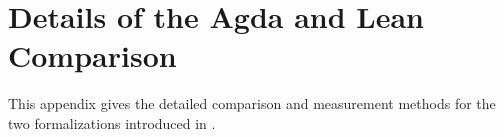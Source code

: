 \documentclass[acmsmall,screen,nonacm]{acmart}
\begin{document}




\FloatBarrier

\iffalse
\section{Details of the Agda and Lean Comparison}\label{app:agda-lean-comparison}

This appendix gives the detailed comparison and measurement methods for the two formalizations introduced in .
\end{document}
